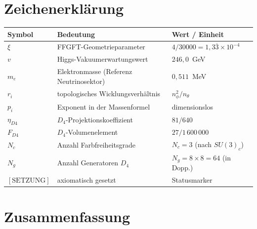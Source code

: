 
\section*{Zeichenerklärung}

\begin{center}
\begin{tabular}{lll}
\toprule
Symbol & Bedeutung & Wert / Einheit \\
\midrule
$\xi$           & FFGFT-Geometrieparameter                        & $4/30000 = 1{,}3\overline{3}\times10^{-4}$ \\
$v$             & Higgs-Vakuumerwartungswert                       & $246{,}0$~GeV \\
$m_e$           & Elektronmasse (Referenz Neutrinosektor)           & $0{,}511$~MeV \\
$r_i$           & topologisches Wicklungsverhältnis                 & $n_\phi^2/n_\theta$ \\
$p_i$           & Exponent in der Massenformel                      & dimensionslos \\
$\eta_{D4}$     & $D_4$-Projektionskoeffizient                      & $81/640$ \\
$F_{D4}$        & $D_4$-Volumenelement                              & $27/1\,600\,000$ \\
$N_c$           & Anzahl Farbfreiheitsgrade                         & $N_c = 3$ (nach $SU(3)_c$) \\
$N_g$           & Anzahl Generatoren $D_4$                          & $N_g = 8 \times 8 = 64$ (in Dopp.) \\
$[\text{SETZUNG}]$ & axiomatisch gesetzt                            & Statusmarker \\
\bottomrule
\end{tabular}
\end{center}



\section*{Zusammenfassung}

